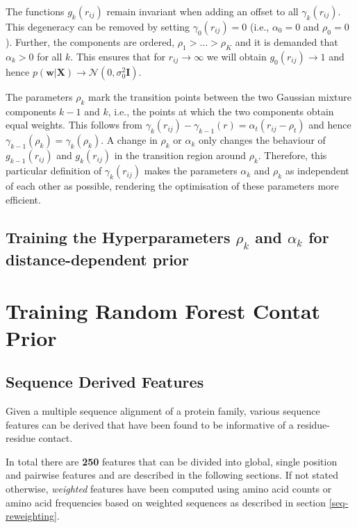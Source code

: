 \documentclass[12pt,a4paper,twoside]{book}
\newcommand{\Gauss}{\mathcal{N}}
\newcommand{\I}{\mathbf{I}}
\newcommand{\rij}{r_{ij}}
\newcommand{\w}{\mathbf{w}}
\newcommand{\X}{\mathbf{X}}
\theoremstyle{definition}
\theoremstyle{definition}
\theoremstyle{remark}
\begin{document}
The functions \(g_k(\rij)\) remain invariant when adding an offset to
all \(\gamma_k(\rij)\). This degeneracy can be removed by setting
\(\gamma_0(\rij) = 0\) (i.e., \(\alpha_0 = 0\) and \(\rho_0=0\)).
Further, the components are ordered, \(\rho_1> \ldots > \rho_K\) and it
is demanded that \(\alpha_k > 0\) for all \(k\). This ensures that for
\(\rij \rightarrow \infty\) we will obtain \(g_0(\rij) \rightarrow 1\)
and hence \(p(\w | \X) \rightarrow \Gauss(0, \sigma_0^2 \I )\).

The parameters \(\rho_k\) mark the transition points between the two
Gaussian mixture components \(k-1\) and \(k\), i.e., the points at which
the two components obtain equal weights. This follows from
\(\gamma_k(\rij) - \gamma_{k-1}(r) = \alpha_{t} ( \rij - \rho_{t})\) and
hence \(\gamma_{k-1}(\rho_k) = \gamma_k(\rho_k)\). A change in
\(\rho_k\) or \(\alpha_k\) only changes the behaviour of
\(g_{k-1}(\rij)\) and \(g_k(\rij)\) in the transition region around
\(\rho_k\). Therefore, this particular definition of \(\gamma_k(\rij)\)
makes the parameters \(\alpha_k\) and \(\rho_k\) as independent of each
other as possible, rendering the optimisation of these parameters more
efficient.

\subsection{\texorpdfstring{Training the Hyperparameters \(\rho_k\) and
\(\alpha_k\) for distance-dependent
prior}{Training the Hyperparameters \textbackslash{}rho\_k and \textbackslash{}alpha\_k for distance-dependent prior}}\label{training-the-hyperparameters-rho_k-and-alpha_k-for-distance-dependent-prior}

\section{Training Random Forest Contat
Prior}\label{training-random-forest-contat-prior}

\subsection{Sequence Derived Features}\label{seq-features}

Given a multiple sequence alignment of a protein family, various
sequence features can be derived that have been found to be informative
of a residue-residue contact.

In total there are \textbf{250} features that can be divided into
global, single position and pairwise features and are described in the
following sections. If not stated otherwise, \emph{weighted} features
have been computed using amino acid counts or amino acid frequencies
based on weighted sequences as described in section
\ref{seq-reweighting}.
\end{document}

